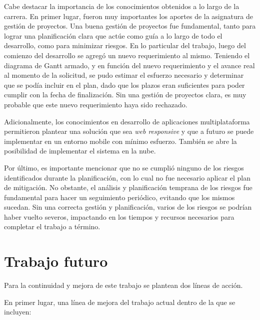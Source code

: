 Cabe destacar la importancia de los conocimientos obtenidos a lo largo de la carrera. En primer lugar, fueron muy importantes los aportes de la asignatura de gestión de proyectos. Una buena gestión de proyectos fue fundamental, tanto para lograr una planificación clara que actúe como guía a lo largo de todo el desarrollo, como para minimizar riesgos. En lo particular del trabajo, luego del comienzo del desarrollo se agregó un nuevo requerimiento al mismo. Teniendo el diagrama de Gantt \citep{WEBSITE:DiagGantt} armado, y en función del nuevo requerimiento y el avance real al momento de la solicitud, se pudo estimar el esfuerzo necesario y determinar que se podía incluir en el plan, dado que los plazos eran suficientes para poder cumplir con la fecha de finalización. Sin una gestión de proyectos clara, es muy probable que este nuevo requerimiento haya sido rechazado. 

Adicionalmente, los conocimientos en desarrollo de aplicaciones multiplataforma permitieron plantear una solución que sea \textit{web responsive} y que a futuro se puede implementar en un entorno mobile con mínimo esfuerzo. También se abre la posibilidad de implementar el sistema en la nube.

Por último, es importante mencionar que no se cumplió ninguno de los riesgos identificados durante la planificación, con lo cual no fue necesario aplicar el plan de mitigación. No obstante, el análisis y planificación temprana de los riesgos fue fundamental para hacer un seguimiento periódico, evitando que los mismos sucedan. Sin una correcta gestión y planificación, varios de los riesgos se podrían haber vuelto severos, impactando en los tiempos y recursos necesarios para completar el trabajo a término.


\section{Trabajo futuro}

Para la continuidad y mejora de este trabajo se plantean dos líneas de acción.

En primer lugar, una línea de mejora del trabajo actual dentro de la que se incluyen:

